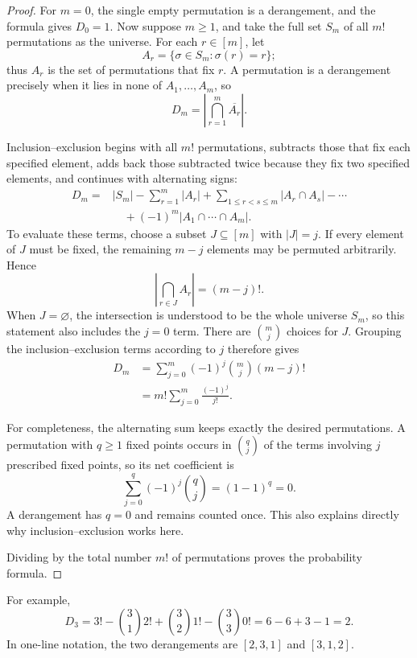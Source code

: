 \documentclass[11pt,a4paper]{article}
\begin{document}
\begin{proof}
For \(m=0\), the single empty permutation is a derangement, and the formula
gives \(D_0=1\). Now suppose \(m\geq 1\), and take the full set \(S_m\) of
all \(m!\) permutations as the universe. For each \(r\in[m]\), let
\[
  A_r=\{\sigma\in S_m:\sigma(r)=r\};
\]
thus \(A_r\) is the set of permutations that fix \(r\). A permutation is a
derangement precisely when it lies in none of \(A_1,\ldots,A_m\), so
\[
  D_m=\left|\bigcap_{r=1}^{m}\overline{A_r}\right|.
\]

Inclusion--exclusion begins with all \(m!\) permutations, subtracts those
that fix each specified element, adds back those subtracted twice because
they fix two specified elements, and continues with alternating signs:
\begin{align*}
  D_m
    ={}&|S_m|-\sum_{r=1}^{m}|A_r|
       +\sum_{1\leq r<s\leq m}|A_r\cap A_s|-\cdots\\
       &\quad+(-1)^m|A_1\cap\cdots\cap A_m|.
\end{align*}
To evaluate these terms, choose a subset \(J\subseteq[m]\) with
\(|J|=j\). If every element of \(J\) must be fixed, the remaining \(m-j\)
elements may be permuted arbitrarily. Hence
\[
  \left|\bigcap_{r\in J}A_r\right|=(m-j)!.
\]
When \(J=\varnothing\), the intersection is understood to be the whole
universe \(S_m\), so this statement also includes the \(j=0\) term.
There are \(\binom{m}{j}\) choices for \(J\). Grouping the
inclusion--exclusion terms according to \(j\) therefore gives
\begin{align*}
  D_m
    &=\sum_{j=0}^{m}(-1)^j\binom{m}{j}(m-j)!\\
    &=m!\sum_{j=0}^{m}\frac{(-1)^j}{j!}.
\end{align*}

For completeness, the alternating sum keeps exactly the desired
permutations. A permutation with \(q\geq1\) fixed points occurs in
\(\binom{q}{j}\) of the terms involving \(j\) prescribed fixed points, so
its net coefficient is
\[
  \sum_{j=0}^{q}(-1)^j\binom{q}{j}=(1-1)^q=0.
\]
A derangement has \(q=0\) and remains counted once. This also explains
directly why inclusion--exclusion works here.

Dividing by the total number \(m!\) of permutations proves the probability
formula.
\end{proof}

For example,
\[
  D_3
    =3!-\binom{3}{1}2!+\binom{3}{2}1!-\binom{3}{3}0!
    =6-6+3-1
    =2.
\]
In one-line notation, the two derangements are \([2,3,1]\) and
\([3,1,2]\).
\end{document}
